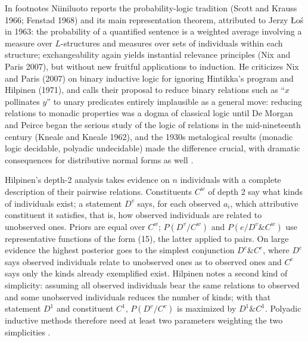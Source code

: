 In footnotes Niiniluoto reports the probability-logic tradition (Scott
and Krauss 1966; Fenstad 1968) and its main representation theorem,
attributed to Jerzy Łoś in 1963: the probability of a quantified sentence
is a weighted average involving a measure over \(L\)-structures and
measures over sets of individuals within each structure; exchangeability
again yields instantial relevance principles (Nix and Paris 2007), but
without new fruitful applications to induction. He criticizes Nix and
Paris (2007) on binary inductive logic for ignoring Hintikka's program and
Hilpinen (1971), and calls their proposal to reduce binary relations such
as ``\(x\) pollinates \(y\)'' to unary predicates entirely implausible as a
general move: reducing relations to monadic properties was a dogma of
classical logic until De Morgan and Peirce began the serious study of
the logic of relations in the mid-nineteenth century (Kneale and Kneale
1962), and the 1930s metalogical
results (monadic logic decidable, polyadic undecidable) made the
difference crucial, with dramatic consequences for distributive normal
forms as well \cite[pp.~327--328 and nn.~5--6]{Niiniluoto2011HintikkaProgramReading}.

Hilpinen's depth-2 analysis takes evidence on \(n\) individuals with a
complete description of their pairwise relations. Constituents \(C^w\) of
depth 2 say what kinds of individuals exist; a statement \(D^v\) says, for
each observed \(a_i\), which attributive constituent it satisfies, that is,
how observed individuals are related to unobserved ones. Priors are equal
over \(C^w\); \(P(D^v/C^w)\) and \(P(e/D^v\&C^w)\) use representative
functions of the form (15), the latter applied to pairs. On large
evidence the highest posterior goes to the simplest conjunction
\(D^e\&C^e\), where \(D^e\) says observed individuals relate to unobserved
ones as to observed ones and \(C^e\) says only the kinds already
exemplified exist. Hilpinen notes a second kind of simplicity: assuming
all observed individuals bear the same relations to observed and some
unobserved individuals reduces the number of kinds; with that statement
\(D^1\) and constituent \(C^1\), \(P(D^v/C^v)\) is maximized by \(D^1\&C^1\).
Polyadic inductive methods therefore need at least two parameters
weighting the two simplicities \cite[p.~328]{Niiniluoto2011HintikkaProgramReading}.

